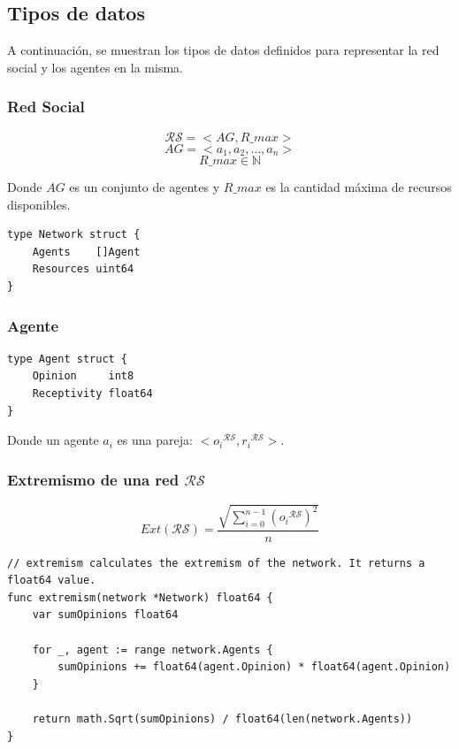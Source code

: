 \documentclass[letterpaper,10pt]{article}
\begin{document}
\subsection*{Tipos de datos}
A continuación, se muestran los tipos de datos definidos para representar la red social y los agentes en la misma.
\subsubsection*{Red Social}
\begin{equation}
  \mathcal{R} \mathcal{S} = < AG, R\_max >
\end{equation}\label{eq:red_social}
\begin{equation}
  AG = < a_1, a_2, \ldots, a_n >
  \label{eq:agentes}
\end{equation}
\begin{equation}
  R\_max \in \mathbb{N}
  \label{eq:recursos}
\end{equation}

Donde $AG$ es un conjunto de agentes y $R\_max$ es la cantidad máxima de recursos disponibles.

\begin{lstlisting}[caption={Definición de red social}, label={lst:r_s}]
type Network struct {
    Agents    []Agent
    Resources uint64
}
\end{lstlisting}
\subsubsection*{Agente}

\begin{lstlisting}[caption={Definición de agente}, label={lst:agente}]
type Agent struct {
    Opinion     int8
    Receptivity float64
}
\end{lstlisting}
Donde un agente $a_i$ es una pareja: $<{o_i}{^{\mathcal{R} \mathcal{S}}}, {r_i}{^{\mathcal{R} \mathcal{S}}}>$.
\newpage
\subsubsection*{Extremismo de una red $\mathcal{R}\mathcal{S}$}
\begin{equation}
  Ext(\mathcal{R}\mathcal{S}) = \frac{\sqrt{\sum_{i=0}^{n-1}{({o_i}{^{\mathcal{R} \mathcal{S}}})^2}}}{n}
  \label{eq:extremismo}
\end{equation}

\begin{lstlisting}[caption={Implementación del extremismo}, label={lst:ext}]
// extremism calculates the extremism of the network. It returns a float64 value.
func extremism(network *Network) float64 {
	var sumOpinions float64

	for _, agent := range network.Agents {
		sumOpinions += float64(agent.Opinion) * float64(agent.Opinion)
	}

	return math.Sqrt(sumOpinions) / float64(len(network.Agents))
}
\end{lstlisting}
\end{document}
